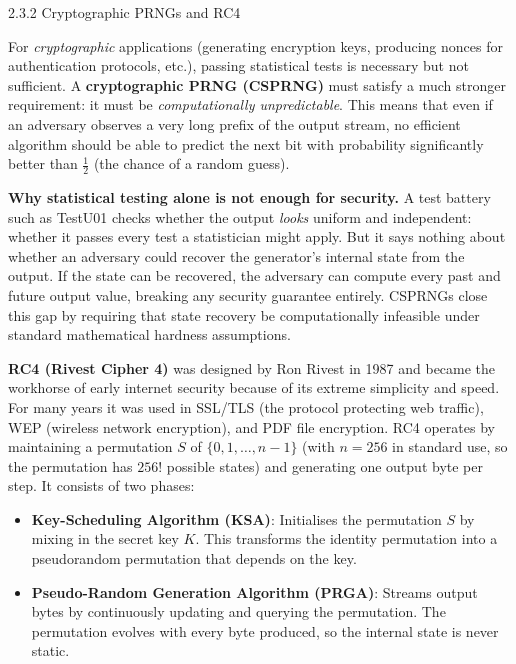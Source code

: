 \documentclass[aspectratio=169,10pt]{beamer}
\begin{document}
\begin{frame}[allowframebreaks]{2.3.2 Cryptographic PRNGs and RC4}

For \emph{cryptographic} applications (generating encryption keys, producing
nonces for authentication protocols, etc.), passing statistical tests is
necessary but not sufficient.  A \textbf{cryptographic PRNG (CSPRNG)} must
satisfy a much stronger requirement: it must be \emph{computationally
unpredictable}.  This means that even if an adversary observes a very long
prefix of the output stream, no efficient algorithm should be able to predict
the next bit with probability significantly better than $\tfrac{1}{2}$ (the
chance of a random guess).

\medskip
\textbf{Why statistical testing alone is not enough for security.}  A test
battery such as TestU01 checks whether the output \emph{looks} uniform and
independent: whether it passes every test a statistician might apply.  But it
says nothing about whether an adversary could recover the generator's internal
state from the output.  If the state can be recovered, the adversary can
compute every past and future output value, breaking any security guarantee
entirely.  CSPRNGs close this gap by requiring that state recovery be
computationally infeasible under standard mathematical hardness assumptions.

\medskip
\textbf{RC4 (Rivest Cipher 4)} was designed by Ron Rivest in 1987 and became
the workhorse of early internet security because of its extreme simplicity and
speed.  For many years it was used in SSL/TLS (the protocol protecting web
traffic), WEP (wireless network encryption), and PDF file encryption.  RC4
operates by maintaining a permutation $S$ of $\{0, 1, \ldots, n-1\}$ (with
$n = 256$ in standard use, so the permutation has $256!$ possible states) and
generating one output byte per step.  It consists of two phases:

\begin{itemize}
  \item \textbf{Key-Scheduling Algorithm (KSA)}: Initialises the permutation
    $S$ by mixing in the secret key $K$.  This transforms the identity
    permutation into a pseudorandom permutation that depends on the key.
  \item \textbf{Pseudo-Random Generation Algorithm (PRGA)}: Streams output
    bytes by continuously updating and querying the permutation.  The
    permutation evolves with every byte produced, so the internal state is
    never static.
\end{itemize}


\end{frame}
\end{document}
